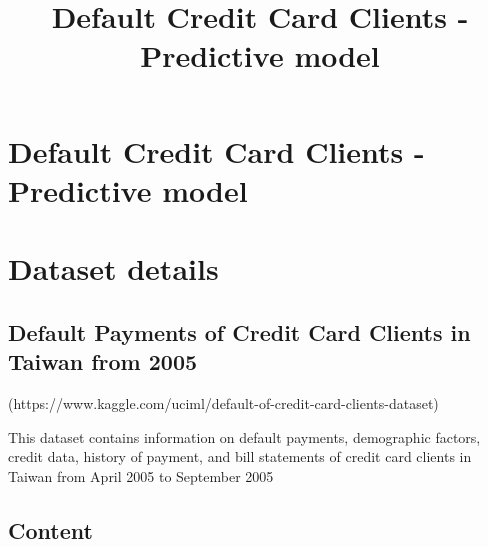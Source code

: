 \documentclass[11pt]{article}
\title{Default Credit Card Clients - Predictive model}
\begin{document}
    
    
    \maketitle
    
    

    
    \section{Default Credit Card Clients - Predictive
model}\label{default-credit-card-clients---predictive-model}

\section{Dataset details}\label{dataset-details}

\subsection{Default Payments of Credit Card Clients in Taiwan from
2005}\label{default-payments-of-credit-card-clients-in-taiwan-from-2005}

(https://www.kaggle.com/uciml/default-of-credit-card-clients-dataset)

This dataset contains information on default payments, demographic
factors, credit data, history of payment, and bill statements of credit
card clients in Taiwan from April 2005 to September 2005

\subsection{Content}\label{content}
\end{document}
